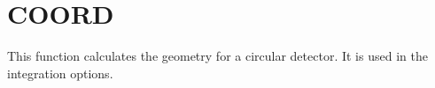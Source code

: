 \section{COORD}
\label{sect:coord}

\noindent This function calculates the geometry for a circular detector. It
is used in the integration options.\\

